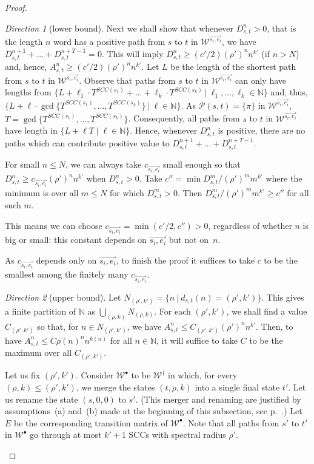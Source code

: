 \documentclass[10pt,a4paper]{amsart}
\numberwithin{equation}{section}
\theoremstyle{plain}
\theoremstyle{definition}
\theoremstyle{remark}
\newtheorem{dir}{Direction}
\newcommand\waannotated{\wa^\dagger}
\newcommand\period{T}
\newcommand\dgf{d}
\newcommand{\SCC}{\ensuremath{\mathit{SCC}}}
\newcommand\wa{\mathcal{W}}
\begin{document}
\begin{proof}
\begin{dir}[{lower bound}]
Next we shall show that whenever $D_{s,t}^{n}>0$, that is the length $n$ word has a positive path from $s$ to $t$ in $\wa^{\vec{s_i,e_i}}$, we have $D_{s,t}^{n+1} + \dots + D_{s,t}^{n+T-1} = 0$. This will imply $D_{s,t}^n  \ge (c'/2) (\rho')^n n^{k'}$ (if $n > N$)
and, hence, $A_{s,t}^n \ge (c'/2) (\rho')^n n^{k'}$. Let $L$ be the length of  the shortest path from $s$ to  $t$ in $\wa^{\vec{s_i,e_i}}$.
Observe that paths from $s$ to $t$ in $\wa^{\vec{s_i,e_i}}$ can only have lengths from
$\{L + \ell_1 \cdot \period^{\SCC(s_1)} + \dots + \ell_k \cdot \period^{\SCC(s_k)} \ | \ \ell_1, \dots, \ell_k \in \mathbb{N} \}$
and, thus,
$\{L + \ell\cdot \gcd\{\period^{\SCC(s_1)},\dots, \period^{\SCC(s_k)}\} \ | \ \ell\in \mathbb{N} \}$.
As $\mathscr{P}(s,t)=\{\pi\}$ in $\wa^{\vec{s_i,e_i}}$,  $T = \gcd\{\period^{\SCC(s_1)},\dots, \period^{\SCC(s_k)}\}$.
Consequently, all paths from $s$ to $t$ in $\wa^{\vec{s_i,e_i}}$ have length in $\{ L+\ell T\mid \ell \in\mathbb{N}\}$.
Hence,  whenever $D_{s,t}^n$ is positive, there are no paths which can
contribute positive value to $D_{s,t}^{n+1} + \dots + D_{s,t}^{n+T-1}$.

For small $n\le N$, we can always take $c_{\vec{s_i,e_i}}$ small enough so that $D_{s,t}^n \ge c_{\vec{s_i,e_i}}(\rho')^n n^{k'}$ when $D_{s,t}^n > 0$. Take $c'' = \min D^m_{s,t} / (\rho')^m m^{k'}$ where
the minimum is over all $m \le N$ for which $D^m_{s,t} > 0$. Then $D^m_{s,t} / (\rho')^m m^{k'} \ge c''$ for all such $m$.

This means we can choose $c_{\vec{s_i,e_i}} = \min(c'/2, c'') > 0$,
regardless of whether $n$ is big or small:
this constant depends on $\vec{s_i,e_i}$ but not on~$n$.

As $c_{\vec{s_i,e_i}}$ depends only on $\vec{s_i,e_i}$,
to finish the proof it suffices to take $c$
to be the smallest  among the finitely many $c_{\vec{s_i,e_i}}$.
\end{dir}
\begin{dir}[upper bound]
Let $N_{(\rho',k')} = \{n\ |\ \dgf_{s,t}(n) = (\rho',k')\}$. This gives a finite partition of $\mathbb{N}$ as $\bigcup_{(\rho,k)} N_{(\rho,k)}$.
For each $(\rho',k')$, we shall find a value $C_{(\rho',k')}$ so that, for $n \in N_{(\rho',k')}$, we have $A_{s,t}^n \le C_{(\rho',k')} (\rho')^n n^{k'}$.
Then, to have $A_{s,t}^n \le C  \rho(n)^n n^{k(n)}$  for all $n\in \mathbb{N}$, it will suffice to take $C$ to be the maximum  over all $C_{(\rho',k')}$.

Let us fix $(\rho',k')$. Consider $\wa^\bullet$ to be $\waannotated$ in which,  for every $(\rho,k) \le (\rho',k')$, we merge the states $(t,\rho,k)$ into a single final state $t'$.
Let us rename the state $(s,0,0)$ to $s'$.
(This merger and renaming are justified by assumptions~(a) and~(b) made
 at the beginning of this subsection, see p.~\pageref{conp-ub-assumptions}.)
Let $E$ be the corresponding transition matrix of $\wa^\bullet$.
Note that all paths from $s'$ to $t'$ in $\wa^\bullet$ go through at most $k'+1$ SCCs with spectral radius $\rho'$.


\end{dir}
\end{proof}
\end{document}
